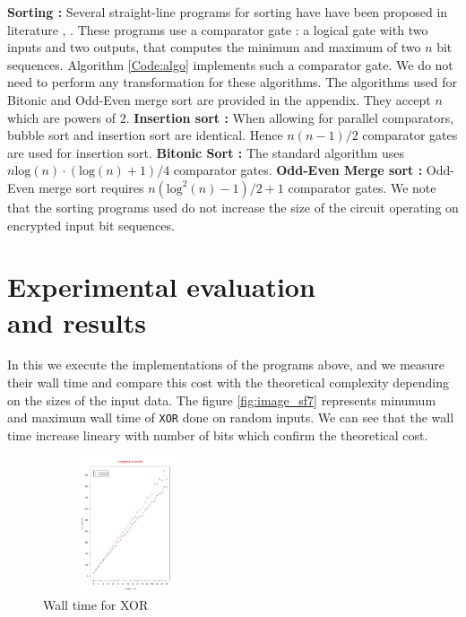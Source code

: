 \documentclass{acm_proc_article-sp}
\begin{document}
\textbf{Sorting :} Several straight-line programs for sorting have have been proposed in literature \cite{dk}, \cite{Batcher:1968:SNA:1468075.1468121}. These programs use a comparator gate : a logical gate with two inputs and two outputs, that computes the minimum and maximum of two $n$ bit sequences. Algorithm \autoref{Code:algo} implements such a comparator gate. We do not need to perform any transformation for these algorithms. The algorithms used for Bitonic and Odd-Even merge sort are provided in the appendix. They accept $n$ which are powers of $2$.
\newline \newline
\textbf{Insertion sort :} When allowing for parallel comparators, bubble sort and insertion sort are identical. Hence $n(n-1)/2$ comparator gates are used for insertion sort.\newline \newline
\textbf{Bitonic Sort :} The standard algorithm uses $n\mathrm{log}(n)·(\mathrm{log}(n)+1)/4$ comparator gates. \newline \newline
\textbf{Odd-Even Merge sort :} Odd-Even merge sort requires  $n(\mathrm{log}^{2}(n)-1)/2 + 1 $ comparator gates.\newline
We note that the sorting programs used do not increase the size of the circuit operating on encrypted input bit sequences.

\section{Experimental evaluation \\ and results}
\label{Sec:Eval}
In this we execute the implementations of the programs above, and we measure their wall time and compare this cost with the theoretical complexity depending on the sizes of the input data.
The figure \autoref{fig:image_sf7} represents minumum and maximum wall time of \texttt{XOR} done on random inputs. We can see that the wall time increase lineary with number of bits which confirm the theoretical cost.
\begin{figure}[!H]%
\centering
\includegraphics[width=5cm, height=4cm]{f4.pdf} 
\caption{Wall time for XOR} 
\label{fig:image_sf0} %
\end{figure}
\end{document}
